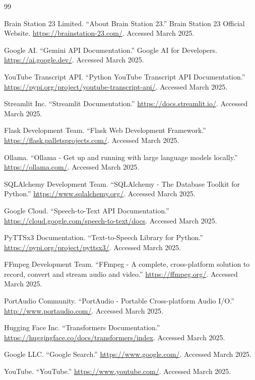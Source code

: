\documentclass[12pt,a4paper]{article}
\begin{document}
\begin{thebibliography}{99}

Brain Station 23 Limited. “About Brain Station 23.” Brain Station 23 Official Website. \url{https://brainstation-23.com/}. Accessed March 2025.

Google AI. “Gemini API Documentation.” Google AI for Developers. \url{https://ai.google.dev/}. Accessed March 2025.

YouTube Transcript API. “Python YouTube Transcript API Documentation.” \url{https://pypi.org/project/youtube-transcript-api/}. Accessed March 2025.

Streamlit Inc. “Streamlit Documentation.” \url{https://docs.streamlit.io/}. Accessed March 2025.

Flask Development Team. “Flask Web Development Framework.” \url{https://flask.palletsprojects.com/}. Accessed March 2025.

Ollama. “Ollama - Get up and running with large language models locally.” \url{https://ollama.com/}. Accessed March 2025.

SQLAlchemy Development Team. “SQLAlchemy - The Database Toolkit for Python.” \url{https://www.sqlalchemy.org/}. Accessed March 2025.

Google Cloud. “Speech-to-Text API Documentation.” \url{https://cloud.google.com/speech-to-text/docs}. Accessed March 2025.

PyTTSx3 Documentation. “Text-to-Speech Library for Python.” \url{https://pypi.org/project/pyttsx3/}. Accessed March 2025.

FFmpeg Development Team. “FFmpeg - A complete, cross-platform solution to record, convert and stream audio and video.” \url{https://ffmpeg.org/}. Accessed March 2025.

PortAudio Community. “PortAudio - Portable Cross-platform Audio I/O.” \url{http://www.portaudio.com/}. Accessed March 2025.

Hugging Face Inc. “Transformers Documentation.” \url{https://huggingface.co/docs/transformers/index}. Accessed March 2025.

Google LLC. “Google Search.” \url{https://www.google.com/}. Accessed March 2025.

YouTube. “YouTube.” \url{https://www.youtube.com/}. Accessed March 2025.

\end{thebibliography}
\newpage
\end{document}
